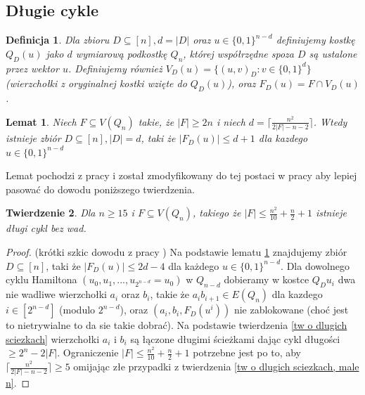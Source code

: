 \documentclass{pracamgr}
\newtheorem{defi}{Definicja}[section] %
\newtheorem{theorem}{Twierdzenie}
\newtheorem{lemma}[theorem]{Lemat}
\begin{document}
   \subsection{Długie cykle}
    \begin{defi}\label{przekrój kostki}
     Dla zbioru $D\subseteq[n], d=|D|$ oraz $u\in\{0,1\}^{n-d}$ definiujemy kostkę $Q_D(u)$ jako $d$ wymiarową podkostkę $Q_n$, której współrzędne spoza $D$
     są ustalone przez wektor $u$. Definiujemy również $V_D(u)=\{(u,v)_D:v\in\{0,1\}^d\}$ (wierzchołki z oryginalnej kostki wzięte do $Q_D(u)$), oraz
     $F_D(u)=F\cap V_D(u)$.
    \end{defi}
    \begin{lemma}\label{dlugi cykl - podzial kostki}
     Niech $F\subseteq V(Q_n)$ takie, że $|F|\ge 2n$ i niech $d=\lceil\frac{n^2}{2|F|-n-2}\rceil$.
     Wtedy istnieje zbiór $D\subseteq[n],|D|=d$, taki że $|F_D(u)|\le d+1$ dla kazdego $u\in\{0,1\}^{n-d}$
    \end{lemma}
    Lemat pochodzi z pracy \cite{Wie} i został zmodyfikowany do tej postaci w pracy \cite{FG} aby lepiej pasować do dowodu poniższego twierdzenia.
    \begin{theorem}\label{dlugi cykl}
     Dla $n\ge15$ i $F\subseteq V(Q_n)$, takiego że $|F|\le\frac{n^2}{10}+\frac{n}{2}+1$ istnieje długi cykl bez wad.
    \end{theorem}
    \begin{proof}
     (krótki szkic dowodu z pracy \cite{FG})\newline
     Na podstawie lematu \ref{dlugi cykl - podzial kostki} znajdujemy zbiór $D\subseteq[n]$, taki że $|F_D(u)|\le 2d-4$ dla każdego $u\in\{0,1\}^{n-d}$.
     Dla dowolnego cyklu Hamiltona $(u_0,u_1,...,u_{2^{n-d}}=u_0)$ w $Q_{n-d}$ dobieramy w kostce $Q_D{u_i}$ dwa nie wadliwe
     wierzchołki $a_i$ oraz $b_i$, takie że $a_ib_{i+1}\in E(Q_n)$ dla kazdego $i\in[2^{n-d}]$ (modulo $2^{n-d}$),
     oraz $(a_i,b_i,F_D(u^i))$ nie zablokowane (choć jest to nietrywialne to da sie takie dobrać).
     Na podstawie twierdzenia \ref{tw o dlugich sciezkach} wierzchołki $a_i$ i $b_i$ są łączone długimi ścieżkami dając cykl długości $\ge 2^n-2|F|$.
     Ograniczenie $|F|\le\frac{n^2}{10}+\frac{n}{2}+1$ potrzebne jest po to, aby $\lceil\frac{n^2}{2|F|-n-2}\rceil\ge5$ omijając złe przypadki z twierdzenia
     \ref{tw o dlugich sciezkach, male n}.
    \end{proof}
\end{document}
